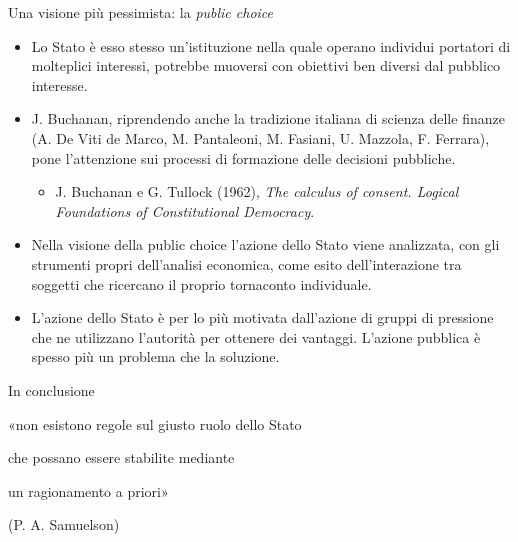 \documentclass[aspectratio=64,12pt]{beamer}
\begin{document}
\begin{frame}{Una visione più pessimista: la \emph{public choice}}
\begin{itemize}
\item Lo Stato è esso stesso un’istituzione nella quale operano individui portatori di molteplici interessi, potrebbe muoversi con obiettivi ben diversi dal pubblico interesse.
\item J. Buchanan, riprendendo anche la tradizione italiana di scienza delle finanze (A. De Viti de Marco, M. Pantaleoni, M. Fasiani, U. Mazzola, F. Ferrara), pone l’attenzione sui processi di formazione delle decisioni pubbliche.
\begin{itemize}
\item J. Buchanan e G. Tullock (1962), \emph{The calculus of consent. Logical Foundations of Constitutional Democracy}.
\end{itemize}
\item Nella visione della \alert{public choice} l’azione dello Stato viene analizzata, con gli strumenti propri dell’analisi economica, come esito dell’interazione tra soggetti che ricercano il proprio tornaconto individuale.
\item L’azione dello Stato è per lo più motivata dall’azione di gruppi di pressione che ne utilizzano l’autorità per ottenere dei vantaggi. L’azione pubblica è spesso più un problema che la soluzione.
\end{itemize}
\end{frame}

\begin{frame}{In conclusione}
\begin{center}
\Large
«non esistono regole sul giusto ruolo dello Stato

che possano essere stabilite mediante

un ragionamento a priori»

(P. A. Samuelson)
\end{center}
\end{frame}
\end{document}

